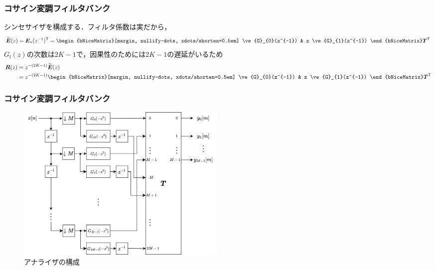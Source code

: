 \documentclass[14pt,xcolor=dvipsnames,table,dvipdfmx]{beamer}
\begin{document}
\begin{frame}[c]
    \frametitle{コサイン変調フィルタバンク}
    シンセサイザを構成する．フィルタ係数は実だから，
    \begin{align}
        \widetilde{\ve{E}}(z) = \ve{E}_{\ast}(z^{-1})^{\mathsf{T}} =
        \begin{bNiceMatrix}[margin, nullify-dots, xdots/shorten=0.5em]
            \ve{G}_{0}(z^{-1}) & z \ve{G}_{1}(z^{-1})
        \end{bNiceMatrix}
        \ve{T}^{\mathsf{T}}
    \end{align}
    $G_{l}(z)$の次数は$2K - 1$で，因果性のためには$2K - 1$の遅延がいるため
    \begin{align}
        \ve{R}(z) &= z^{-(2K-1)} \widetilde{\ve{E}}(z) \nonumber \\
        &=
        z^{-(2K-1)}
        \begin{bNiceMatrix}[margin, nullify-dots, xdots/shorten=0.5em]
            \ve{G}_{0}(z^{-1}) & z \ve{G}_{1}(z^{-1})
        \end{bNiceMatrix}
        \ve{T}^{\mathsf{T}} \label{eq:synthesizer_matrix_of_cos_modulated_filter_bank}
    \end{align}
\end{frame}

\begin{frame}[c]
    \frametitle{コサイン変調フィルタバンク}
    \begin{figure}
        \includegraphics[width=103mm]{./figs/cos_modulated_analysis_bank_filter.drawio.png}
        \caption*{アナライザの構成}
    \end{figure}
\end{frame}
\end{document}
